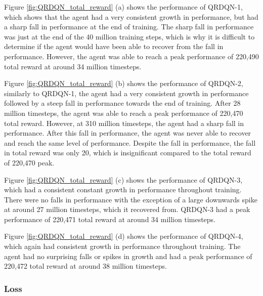Figure \ref{fig:QRDQN_total_reward} (a) shows the performance of QRDQN-1, which shows that the agent had a very consistent growth in performance, but had a sharp fall in performance at the end of training. The sharp fall in performance was just at the end of the 40 million training steps, which is why it is difficult to determine if the agent would have been able to recover from the fall in performance. However, the agent was able to reach a peak performance of 220,490 total reward at around 34 million timesteps. 

Figure \ref{fig:QRDQN_total_reward} (b) shows the performance of QRDQN-2, similarly to QRDQN-1, the agent had a very consistent growth in performance followed by a steep fall in performance towards the end of training. After 28 million timesteps, the agent was able to reach a peak performance of 220,470 total reward. However, at 310 million timesteps, the agent had a sharp fall in performance. After this fall in performance, the agent was never able to recover and reach the same level of performance. Despite the fall in performance, the fall in total reward was only 20, which is insignificant compared to the total reward of 220,470 peak.

Figure \ref{fig:QRDQN_total_reward} (c) shows the performance of QRDQN-3, which had a consistent constant growth in performance throughout training. There were no falls in performance with the exception of a large downwards spike at around 27 million timesteps, which it recovered from. QRDQN-3 had a peak performance of 220,471 total reward at around 34 million timesteps.

Figure \ref{fig:QRDQN_total_reward} (d) shows the performance of QRDQN-4, which again had consistent growth in performance throughout training. The agent had no surprising falls or spikes in growth and had a peak performance of 220,472 total reward at around 38 million timesteps.

\subsubsection{Loss}

